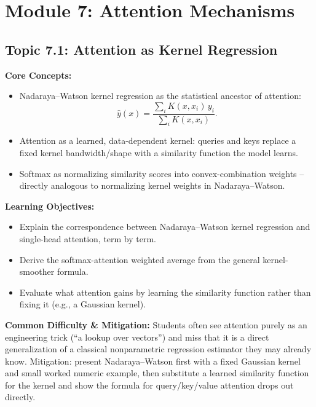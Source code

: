 \documentclass[11pt]{article}
\begin{document}
\section{Module 7: Attention Mechanisms}

\subsection{Topic 7.1: Attention as Kernel Regression}

\textbf{Core Concepts:}
\begin{itemize}
  \item Nadaraya--Watson kernel regression as the statistical ancestor of attention:
  \[ \hat y(x) = \frac{\sum_i K(x, x_i)\, y_i}{\sum_i K(x, x_i)}. \]
  \item Attention as a learned, data-dependent kernel: queries and keys replace a fixed kernel bandwidth/shape with a similarity function the model learns.
  \item Softmax as normalizing similarity scores into convex-combination weights -- directly analogous to normalizing kernel weights in Nadaraya--Watson.
\end{itemize}

\textbf{Learning Objectives:}
\begin{itemize}
  \item Explain the correspondence between Nadaraya--Watson kernel regression and single-head attention, term by term.
  \item Derive the softmax-attention weighted average from the general kernel-smoother formula.
  \item Evaluate what attention gains by learning the similarity function rather than fixing it (e.g., a Gaussian kernel).
\end{itemize}

\textbf{Common Difficulty \& Mitigation:} Students often see attention purely as an engineering trick (``a lookup over vectors'') and miss that it is a direct generalization of a classical nonparametric regression estimator they may already know. Mitigation: present Nadaraya--Watson first with a fixed Gaussian kernel and small worked numeric example, then substitute a learned similarity function for the kernel and show the formula for query/key/value attention drops out directly.
\end{document}
